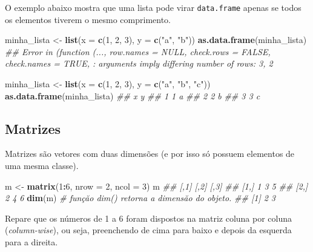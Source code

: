 \documentclass[]{book}
\newenvironment{Shaded}{\begin{snugshade}}{\end{snugshade}}
\newcommand{\CommentTok}[1]{\textcolor[rgb]{0.56,0.35,0.01}{\textit{#1}}}
\newcommand{\DataTypeTok}[1]{\textcolor[rgb]{0.13,0.29,0.53}{#1}}
\newcommand{\DecValTok}[1]{\textcolor[rgb]{0.00,0.00,0.81}{#1}}
\newcommand{\KeywordTok}[1]{\textcolor[rgb]{0.13,0.29,0.53}{\textbf{#1}}}
\newcommand{\NormalTok}[1]{#1}
\newcommand{\OperatorTok}[1]{\textcolor[rgb]{0.81,0.36,0.00}{\textbf{#1}}}
\newcommand{\StringTok}[1]{\textcolor[rgb]{0.31,0.60,0.02}{#1}}
\begin{document}
O exemplo abaixo mostra que uma lista pode virar \texttt{data.frame} apenas se todos os elementos tiverem o mesmo comprimento.

\begin{Shaded}
\begin{Highlighting}[]
\NormalTok{minha_lista <-}\StringTok{ }\KeywordTok{list}\NormalTok{(}\DataTypeTok{x =} \KeywordTok{c}\NormalTok{(}\DecValTok{1}\NormalTok{, }\DecValTok{2}\NormalTok{, }\DecValTok{3}\NormalTok{), }\DataTypeTok{y =} \KeywordTok{c}\NormalTok{(}\StringTok{"a"}\NormalTok{, }\StringTok{"b"}\NormalTok{))}
\KeywordTok{as.data.frame}\NormalTok{(minha_lista)}
\CommentTok{## Error in (function (..., row.names = NULL, check.rows = FALSE, check.names = TRUE, : arguments imply differing number of rows: 3, 2}

\NormalTok{minha_lista <-}\StringTok{ }\KeywordTok{list}\NormalTok{(}\DataTypeTok{x =} \KeywordTok{c}\NormalTok{(}\DecValTok{1}\NormalTok{, }\DecValTok{2}\NormalTok{, }\DecValTok{3}\NormalTok{), }\DataTypeTok{y =} \KeywordTok{c}\NormalTok{(}\StringTok{"a"}\NormalTok{, }\StringTok{"b"}\NormalTok{, }\StringTok{"c"}\NormalTok{))}
\KeywordTok{as.data.frame}\NormalTok{(minha_lista)}
\CommentTok{##   x y}
\CommentTok{## 1 1 a}
\CommentTok{## 2 2 b}
\CommentTok{## 3 3 c}
\end{Highlighting}
\end{Shaded}

\hypertarget{matrizes}{%
\subsection{Matrizes}\label{matrizes}}

Matrizes são vetores com duas dimensões (e por isso só possuem elementos de uma mesma classe).

\begin{Shaded}
\begin{Highlighting}[]
\NormalTok{m <-}\StringTok{ }\KeywordTok{matrix}\NormalTok{(}\DecValTok{1}\OperatorTok{:}\DecValTok{6}\NormalTok{, }\DataTypeTok{nrow =} \DecValTok{2}\NormalTok{, }\DataTypeTok{ncol =} \DecValTok{3}\NormalTok{)}
\NormalTok{m}
\CommentTok{##      [,1] [,2] [,3]}
\CommentTok{## [1,]    1    3    5}
\CommentTok{## [2,]    2    4    6}
\KeywordTok{dim}\NormalTok{(m) }\CommentTok{# funçăo dim() retorna a dimensăo do objeto.}
\CommentTok{## [1] 2 3}
\end{Highlighting}
\end{Shaded}

Repare que os números de 1 a 6 foram dispostos na matriz coluna por coluna (\emph{column-wise}), ou seja, preenchendo de cima para baixo e depois da esquerda para a direita.
\end{document}
